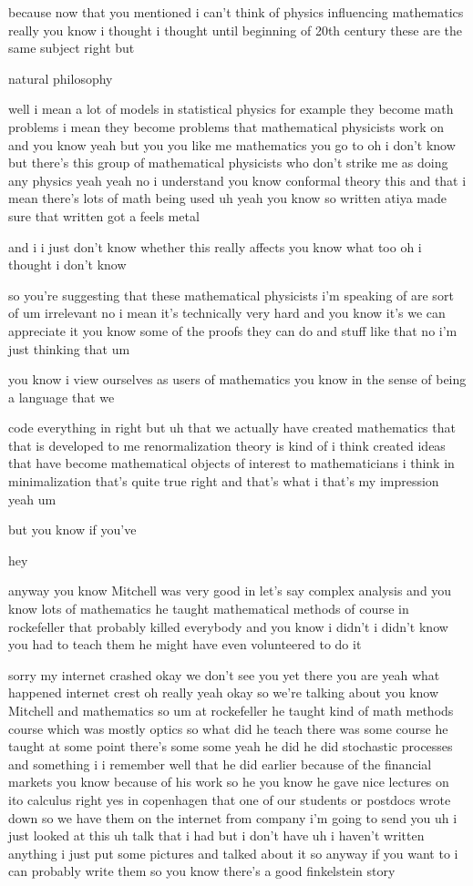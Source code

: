 \begin{description}
because now that you mentioned i can't think of physics influencing mathematics really you know i thought i thought until beginning of 20th century these are the same subject right but

natural philosophy

well i mean a lot of models in statistical physics for example they become math problems i mean they become problems that mathematical physicists work on and you know yeah but you you like me mathematics you go to oh i don't know but there's this group of mathematical physicists who don't strike me as doing any physics yeah yeah no i understand you know conformal theory this and that i mean there's lots of math being used uh yeah you know so written atiya made sure that written got a feels metal

and i i just don't know whether this really affects you know what too oh i thought i don't know

so you're suggesting that these mathematical physicists i'm speaking of are sort of um irrelevant no i mean it's technically very hard and you know it's we can appreciate it you know some of the proofs they can do and stuff like that no i'm just thinking that um

you know i view ourselves as users of mathematics you know in the sense of being a language that we

code everything in right but uh that we actually have created mathematics that that is developed to me renormalization theory is kind of i think created ideas that have become mathematical objects of interest to mathematicians i think in minimalization that's quite true right and that's what i that's my impression yeah um

but you know if you've

hey

anyway you know Mitchell was very good in let's say complex analysis and you know lots of mathematics he taught mathematical methods of course in rockefeller that probably killed everybody and you know i didn't i didn't know you had to teach them he might have even volunteered to do it

sorry my internet crashed okay we don't see you yet there you are yeah what happened internet crest oh really yeah okay so we're talking about you know Mitchell and mathematics so um at rockefeller he taught kind of math methods course which was mostly optics so what did he teach there was some course he taught at some point there's some some yeah he did he did stochastic processes and something i i remember well that he did earlier because of the financial markets you know because of his work so he you know he gave nice lectures on ito calculus right yes in copenhagen that one of our students or postdocs wrote down so we have them on the internet from company i'm going to send you uh i just looked at this uh talk that i had but i don't have uh i haven't written anything i just put some pictures and talked about it so anyway if you want to i can probably write them so you know there's a good finkelstein story


\end{description}
